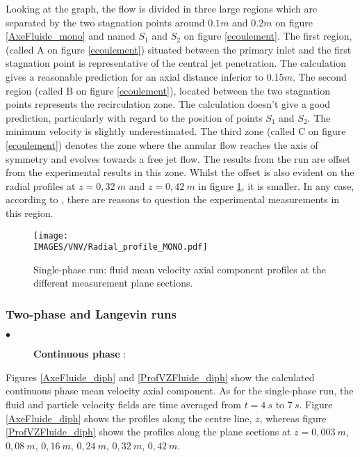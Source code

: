 \noindent
Looking at the graph, the flow is divided in three large regions which are separated by the two stagnation points around $0.1m$ and $0.2m$ on figure \ref{AxeFluide_mono} and named $S_{1}$ and $S_{2}$ on figure \ref{ecoulement}. The first region, (called A on figure \ref{ecoulement}) situated between the primary inlet and the first stagnation point is representative of the central jet penetration. The calculation gives a reasonable prediction for an axial distance inferior to $0.15m$. The second region (called B on figure \ref{ecoulement}), located between the two stagnation points represents the recirculation zone. The calculation doesn't give a good prediction, particularly with regard to the position of points $S_{1}$ and $S_{2}$. The minimum velocity is slightly underestimated. The third zone (called C on figure \ref{ecoulement}) denotes the zone where the annular flow reaches the axis of symmetry and evolves towards a free jet flow. The results from the run are offset from the experimental results in this zone. Whilst the offset is also evident on the radial profiles at $z=0,32~m$ and $z=0,42~m$ in figure \ref{ProfVZFluide_mono}, it is smaller. In any case, according to \cite{Rap3}, there are reasons to question the experimental measurements in this region.

\begin{figure}[H]
   \centerline{\texttt{[image: \\IMAGES/VNV/Radial\_profile\_MONO.pdf]}}
   \caption{Single-phase run: fluid mean velocity axial component profiles at the different measurement plane sections.}
   \label{ProfVZFluide_mono}
\end{figure}

\clearpage

\subsubsection{Two-phase and Langevin runs}

\begin{description}
   \item[$\bullet$] \textbf{Continuous phase} :
\end{description}

Figures \ref{AxeFluide_diph} and \ref{ProfVZFluide_diph} show the calculated continuous phase mean velocity axial component. As for the single-phase run, the fluid and particle velocity fields are time averaged from $t=4~s$ to $7~s$. Figure \ref{AxeFluide_diph} shows the profiles along the centre line, $z$, whereas figure \ref{ProfVZFluide_diph} shows the profiles along the plane sections at $z = 0,003~m$, $0,08~m$, $0,16~m$, $0,24~m$, $0,32~m$, $0,42~m$.

